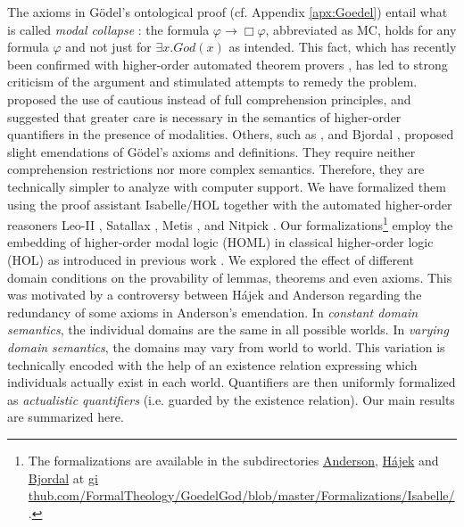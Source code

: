 \documentclass{birkjour}
\theoremstyle{definition}
\theoremstyle{remark}
\numberwithin{equation}{section}
\begin{document}
\noindent The axioms in G\"odel's ontological proof
\citep{GoedelNotes,ScottNotes} (cf. Appendix \ref{apx:Goedel}) entail
what is called \emph{modal collapse}
\citep{Sobel1987,SobelBook2004}: the formula $\varphi \rightarrow \Box
\varphi$, abbreviated as MC, holds for any formula $\varphi$ and not
just for $\exists x. \mathit{God}(x)$ as intended. This fact, which
has recently been confirmed with higher-order automated theorem
provers \citep{C40,J30}, has led to strong criticism of the argument
and stimulated attempts to remedy the problem.
\citet{Hajek_Magari_and_others_1996,Hajek_der_Mathematiker_2001}
proposed the use of cautious instead of full comprehension principles,
and \citet{fitting02:_types_tableaus_god} suggested that
greater care is necessary in the semantics of higher-order quantifiers
in the presence of modalities. Others, such as
\citet{anderson90:_some_emend_of_goedel_ontol_proof,AndersonGettings}, \citet{Hajek2002}
and Bjordal \citet{bjordal99}, proposed slight emendations of G\"odel's
axioms and definitions. They require neither comprehension
restrictions nor more complex semantics. Therefore, they are
technically simpler to analyze with computer support. We have
formalized them using the proof assistant Isabelle/HOL \citep{Isabelle}
together with the automated higher-order reasoners Leo-II \citep{C26},
Satallax \citep{brown2012satallax}, Metis 
\citep{Hurd03first-orderproof}, and Nitpick \citep{Nitpick}.   Our
formalizations\footnote{The   formalizations are available in the
subdirectories \url{Anderson}, \url{Hájek} and \url{Bjordal} at \url{gi
thub.com/FormalTheology/GoedelGod/blob/master/Formalizations/Isabelle/
}.} employ the embedding of higher-order modal logic (HOML) in
classical higher-order logic (HOL) as introduced in previous work
\citep{C40,J30,J23}. We explored the effect of different domain
conditions on the provability of lemmas, theorems and even axioms.
This was motivated by a controversy between Hájek and Anderson
regarding the redundancy of some axioms in Anderson's emendation. In
\emph{constant domain semantics}, the individual domains are the same
in all possible worlds. In \emph{varying domain semantics}, the
domains may vary from world to world. This variation is technically
encoded with the help of an existence relation expressing which
individuals actually exist in each world. Quantifiers are then
uniformly formalized as \emph{actualistic quantifiers} (i.e. guarded by
the existence relation). Our main results are summarized here.


\end{document}
